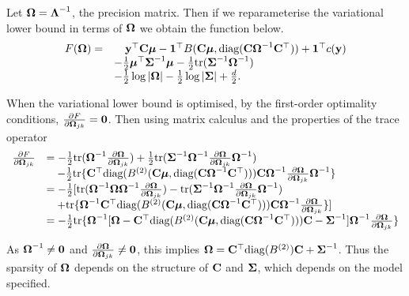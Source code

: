 Let ${\boldsymbol \Omega} = {\boldsymbol \Lambda}^{-1}$, the precision matrix. Then if we reparameterise
the variational lower bound in terms of ${\boldsymbol \Omega}$ we obtain the function below.
\begin{equation}
\label{eq:gva_lower_bound_precision_param_omega}
\begin{array}{ll}
F({\boldsymbol \Omega}) =& \quad {\bf y}^\top {\bf C} {\boldsymbol\mu} - {\bf 1}^\top B({\bf C} {\boldsymbol \mu}, \text{diag}({\bf C} {\boldsymbol \Omega}^{-1} {\bf C}^\top)) + {\bf 1}^\top c({\bf y}) \\
&- \tfrac{1}{2} {\boldsymbol \mu}^\top {\boldsymbol\Sigma}^{-1} {\boldsymbol \mu} - \tfrac{1}{2} \text{tr}({\boldsymbol \Sigma}^{-1} {\boldsymbol \Omega}^{-1}) \\
&- \tfrac{1}{2} \log |{\boldsymbol \Omega}| - \tfrac{1}{2} \log |{\boldsymbol \Sigma}| + \tfrac{d}{2}.
\end{array}
\end{equation}

When the variational lower bound is optimised, by the first-order optimality
conditions, $\tfrac{\partial F}{\partial {\boldsymbol\Omega}_{jk}} = {\bf 0}$. Then using
matrix calculus and the properties of the trace operator
\begin{equation*}
\begin{array}{ll}
\tfrac{\partial F}{\partial {\boldsymbol\Omega}_{jk}} &= -\tfrac{1}{2} \text{tr}({\boldsymbol \Omega}^{-1} \tfrac{\partial {\boldsymbol\Omega}}{\partial {\boldsymbol\Omega}_{jk}}) + \tfrac{1}{2} \text{tr}({\boldsymbol \Sigma}^{-1} {\boldsymbol \Omega}^{-1} \tfrac{\partial {\boldsymbol\Omega}}{\partial {\boldsymbol\Omega}_{jk}} {\boldsymbol \Omega}^{-1}) \\
&\quad -\tfrac{1}{2} \text{tr}\{{\bf C}^\top \text{diag}(B^{(2)}({\bf C} {\boldsymbol \mu}, \text{diag}({\bf C} {\boldsymbol \Omega}^{-1} {\bf C}^\top))) {\bf C} {\boldsymbol \Omega}^{-1} \tfrac{\partial {\boldsymbol\Omega}}{\partial {\boldsymbol\Omega}_{jk}} {\boldsymbol \Omega}^{-1}\} \\
&=-\tfrac{1}{2} [ \text{tr}({\boldsymbol \Omega}^{-1} {\boldsymbol \Omega} {\boldsymbol \Omega}^{-1} \tfrac{\partial {\boldsymbol\Omega}}{\partial {\boldsymbol\Omega}_{jk}}) - \text{tr}({\boldsymbol \Sigma}^{-1} {\boldsymbol \Omega}^{-1} \tfrac{\partial {\boldsymbol\Omega}}{\partial {\boldsymbol\Omega}_{jk}} {\boldsymbol \Omega}^{-1}) \\
&\quad + \text{tr}\{{\boldsymbol \Omega}^{-1} {\bf C}^\top \text{diag}(B^{(2)}({\bf C} {\boldsymbol \mu}, \text{diag}({\bf C} {\boldsymbol \Omega}^{-1} {\bf C}^\top))) {\bf C} {\boldsymbol \Omega}^{-1} \tfrac{\partial {\boldsymbol\Omega}}{\partial {\boldsymbol\Omega}_{jk}}\} ] \\
&= -\tfrac{1}{2} \text{tr}\{{\boldsymbol \Omega}^{-1}[{\boldsymbol \Omega} - {\bf C}^\top \text{diag}(B^{(2)}({\bf C} {\boldsymbol \mu}, \text{diag}({\bf C} {\boldsymbol \Omega}^{-1} {\bf C}^\top))) {\bf C} - {\boldsymbol \Sigma}^{-1} ] {\boldsymbol\Omega}^{-1} \tfrac{\partial {\boldsymbol\Omega}}{\partial {\boldsymbol\Omega}_{jk}}\}
\end{array}
\end{equation*}

As ${\boldsymbol \Omega}^{-1} \ne {\bf0}$ and $\tfrac{\partial {\boldsymbol\Omega}}{\partial
{\boldsymbol\Omega}_{jk}} \ne {\bf0}$, this implies ${\boldsymbol \Omega} = {\bf C}^\top
\text{diag}(B^{(2)}) {\bf C} + {\boldsymbol \Sigma}^{-1}$. Thus the sparsity of ${\boldsymbol \Omega}$
depends on the structure of ${\bf C}$ and ${\boldsymbol \Sigma}$, which depends on the model
specified.

